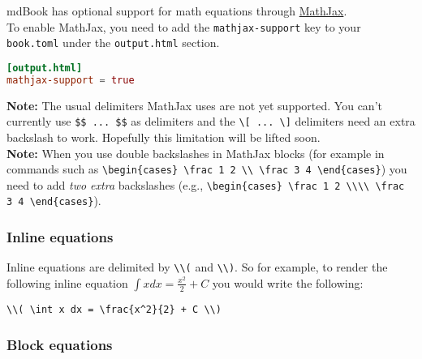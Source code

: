 \documentclass{article}
\begin{document}
mdBook has optional support for math equations through
\href{https://www.mathjax.org/}{MathJax}.\\

To enable MathJax, you need to add the \lstinline|mathjax-support| key to your \lstinline|book.toml|
under the \lstinline|output.html| section.\\
\begin{lstlisting}[language=toml]
[output.html]
mathjax-support = true

\end{lstlisting}

\textbf{Note:} The usual delimiters MathJax uses are not yet supported. You can't
currently use \lstinline|$$ ... $$| as delimiters and the \lstinline|\[ ... \]| delimiters need an
extra backslash to work. Hopefully this limitation will be lifted soon.\\

\textbf{Note:} When you use double backslashes in MathJax blocks (for example in
commands such as \lstinline|\begin{cases} \frac 1 2 \\ \frac 3 4 \end{cases}|) you need
to add \emph{two extra} backslashes (e.g., \lstinline|\begin{cases} \frac 1 2 \\\\ \frac 3 4 \end{cases}|).\\

\subsubsection{Inline equations}
\label{Inline equations}
\label{inline-equations}

Inline equations are delimited by \lstinline|\\(| and \lstinline|\\)|. So for example, to render the
following inline equation \( \int x dx = \frac{x^2}{2} + C \) you would write
the following:\\
\begin{lstlisting}
\\( \int x dx = \frac{x^2}{2} + C \\)

\end{lstlisting}

\subsubsection{Block equations}
\label{Block equations}
\label{block-equations}
\end{document}
